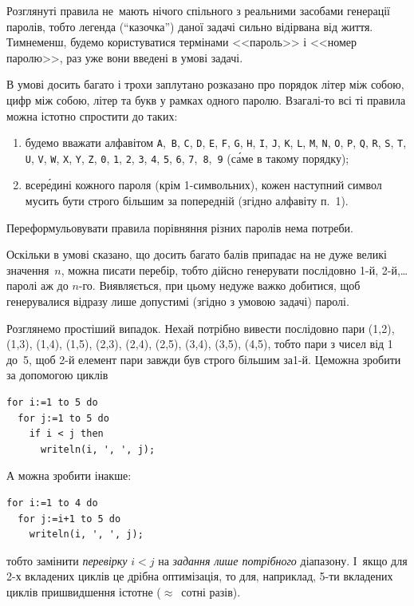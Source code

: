 \documentclass[14pt,a4paper]{extarticle}
\begin{document}
\Tutorial	Розглянуті правила не~мають нічого спільного з реальними засобами генерації паролів, тобто легенда (``казочка'') даної задачі сильно відірвана від життя. Тим\nolinebreak[2] не\nolinebreak[3] менш, будемо користуватися термінами <<пароль>> і <<номер паролю>>, раз уже вони введені в умові задачі.

В умові досить багато і трохи заплутано розказано про порядок літер між собою, цифр між собою, літер та букв у рамках одного паролю. Взагалі-то всі ті правила можна істотно спростити до таких:
\begin{enumerate}
\item
будемо вважати алфавітом \texttt{A},~\texttt{B}, \texttt{C}, \texttt{D}, \texttt{E}, \texttt{F}, \texttt{G}, \texttt{H}, \texttt{I}, \texttt{J}, \texttt{K}, \texttt{L}, \texttt{M}, \texttt{N}, \texttt{O}, \texttt{P}, \texttt{Q}, \texttt{R}, \texttt{S}, \texttt{T}, \texttt{U}, \texttt{V}, \texttt{W}, \texttt{X}, \texttt{Y}, \texttt{Z}, \texttt{0}, \texttt{1}, \texttt{2}, \texttt{3}, \texttt{4}, \texttt{5}, \texttt{6}, \texttt{7},~\texttt{8},~\texttt{9} (с\'{а}ме в такому порядку);
\item
всер\'{е}дині кожного пароля (крім 1-символьних), кожен наступний символ мусить бути строго більшим за попередній (згідно алфавіту п.~1).
\end{enumerate}
Переформульовувати правила порівняння різних паролів нема потреби.

Оскільки в умові сказано, що досить багато балів припадає на не дуже великі значення~$n$, можна писати перебір, тобто дійсно генерувати послідовно \mbox{1-й}, \mbox{2-й},\nolinebreak[3] \dots{} паролі аж до $n$-го. Виявляється, при цьому не\nolinebreak[3] дуже важко добитися, щоб генерувалися відразу лише допустимі (згідно з умовою задачі) паролі.

Розглянемо простіший випадок. Нехай потрібно вивести послідовно пари (1,2), (1,3), (1,4), (1,5), (2,3), (2,4), (2,5), (3,4), (3,5), (4,5), тобто пари з чисел від 1 до~5, щоб \mbox{2-й} елемент пари завжди був строго більшим за\nolinebreak[2] \mbox{1-й}. Це\nolinebreak[3] можна зробити за допомогою циклів
\begin{verbatim}for i:=1 to 5 do
  for j:=1 to 5 do
    if i < j then
      writeln(i, ', ', j);\end{verbatim}
А можна зробити інакше:
\begin{verbatim}for i:=1 to 4 do
  for j:=i+1 to 5 do
    writeln(i, ', ', j);\end{verbatim}
тобто замінити \emph{перевірку} ${i{<}j}$ на \emph{задання лише потрібного} діапазону. %
І~якщо для \mbox{2-х} вкладених циклів це дрібна оптимізація, то для, наприклад, \mbox{5-ти} вкладених циклів пришвидшення істотне ($\approx$~сотні разів).
\end{document}
